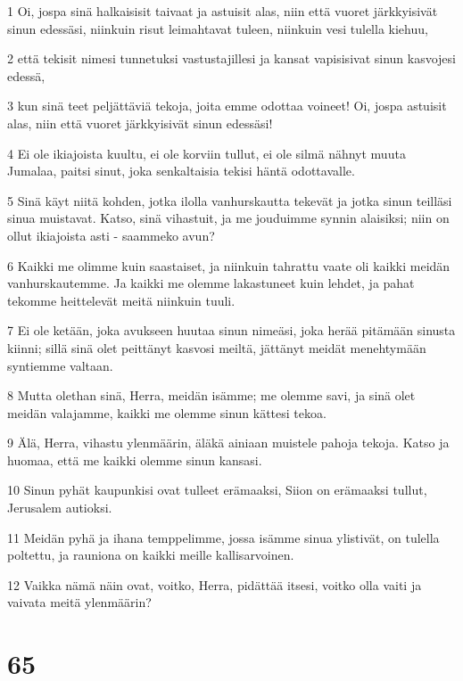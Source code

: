 \par 1 Oi, jospa sinä halkaisisit taivaat ja astuisit alas, niin että vuoret järkkyisivät sinun edessäsi, niinkuin risut leimahtavat tuleen, niinkuin vesi tulella kiehuu,
\par 2 että tekisit nimesi tunnetuksi vastustajillesi ja kansat vapisisivat sinun kasvojesi edessä,
\par 3 kun sinä teet peljättäviä tekoja, joita emme odottaa voineet! Oi, jospa astuisit alas, niin että vuoret järkkyisivät sinun edessäsi!
\par 4 Ei ole ikiajoista kuultu, ei ole korviin tullut, ei ole silmä nähnyt muuta Jumalaa, paitsi sinut, joka senkaltaisia tekisi häntä odottavalle.
\par 5 Sinä käyt niitä kohden, jotka ilolla vanhurskautta tekevät ja jotka sinun teilläsi sinua muistavat. Katso, sinä vihastuit, ja me jouduimme synnin alaisiksi; niin on ollut ikiajoista asti - saammeko avun?
\par 6 Kaikki me olimme kuin saastaiset, ja niinkuin tahrattu vaate oli kaikki meidän vanhurskautemme. Ja kaikki me olemme lakastuneet kuin lehdet, ja pahat tekomme heittelevät meitä niinkuin tuuli.
\par 7 Ei ole ketään, joka avukseen huutaa sinun nimeäsi, joka herää pitämään sinusta kiinni; sillä sinä olet peittänyt kasvosi meiltä, jättänyt meidät menehtymään syntiemme valtaan.
\par 8 Mutta olethan sinä, Herra, meidän isämme; me olemme savi, ja sinä olet meidän valajamme, kaikki me olemme sinun kättesi tekoa.
\par 9 Älä, Herra, vihastu ylenmäärin, äläkä ainiaan muistele pahoja tekoja. Katso ja huomaa, että me kaikki olemme sinun kansasi.
\par 10 Sinun pyhät kaupunkisi ovat tulleet erämaaksi, Siion on erämaaksi tullut, Jerusalem autioksi.
\par 11 Meidän pyhä ja ihana temppelimme, jossa isämme sinua ylistivät, on tulella poltettu, ja rauniona on kaikki meille kallisarvoinen.
\par 12 Vaikka nämä näin ovat, voitko, Herra, pidättää itsesi, voitko olla vaiti ja vaivata meitä ylenmäärin?

\chapter{65}

